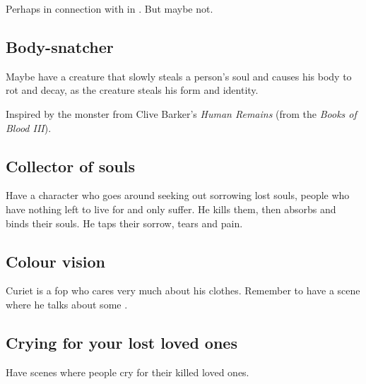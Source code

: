 Perhaps in connection with \Malcur in \TwilightAngelRememberEmph. But maybe not. 









\subsection{Body-snatcher}
Maybe have a creature that slowly steals a person's soul and causes his body to rot and decay, as the creature steals his form and identity. 

Inspired by the monster from Clive Barker's \emph{Human Remains} (from the \emph{Books of Blood III}). 









\subsection{Collector of souls}
Have a character who goes around seeking out sorrowing lost souls, people who have nothing left to live for and only suffer. He kills them, then absorbs and binds their souls. He taps their sorrow, tears and pain. 










\subsection{Colour vision}

Curiet is a fop who cares very much about his clothes. Remember to have a scene where he talks about some .









\subsection{Crying for your lost loved ones}
Have scenes where people cry for their killed loved ones. 

